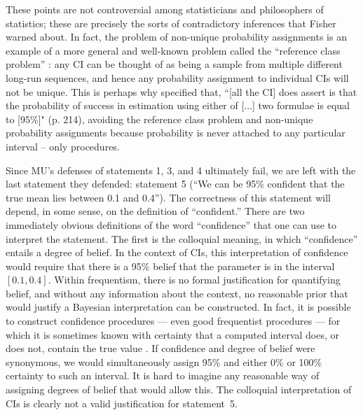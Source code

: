 \documentclass[jou,a4paper,floatsintext,draftfirst]{apa6}\usepackage[]{graphicx}\usepackage[]{color}
\begin{document}
These points are not controversial among statisticians and philosophers of statistics; these are precisely the sorts of contradictory inferences that Fisher warned about. In fact, the problem of non-unique probability assignments is an example of a more general and well-known problem called the ``reference class problem'' \citep{Venn:1888,Reichenbach:1949}: any CI can be thought of as being a sample from multiple different long-run sequences, and hence any probability assignment to individual CIs will not be unique. This is perhaps why \citet{Neyman:1952} specified that, ``[all the CI] does assert is that the probability of success in estimation using either of [...] two formulae is equal to [95\%]" (p. 214), avoiding the reference class problem and non-unique probability assignments because probability is never attached to any particular interval -- only procedures. 

 
Since MU's defenses of statements 1, 3, and 4 ultimately fail, we are left with the last statement they defended: statement 5 (``We can be 95\% confident that the true mean lies between 0.1 and 0.4''). The correctness of this statement will depend, in some sense, on the definition of ``confident.'' There are two immediately obvious definitions of the word ``confidence'' that one can use to interpret the statement. The first is the colloquial meaning, in which ``confidence'' entails a degree of belief.  In the context of CIs, this interpretation of confidence would require that there is a 95\% belief that the parameter is in the interval $[0.1, 0.4]$. Within frequentism, there is no formal justification for quantifying belief, and without any information about the context, no reasonable prior that would justify a Bayesian interpretation can be constructed. In fact, it is possible to construct confidence procedures --- even good frequentist procedures --- for which it is sometimes known with certainty that a computed interval does, or does not, contain the true value \citep{Berger:Wolpert:1988,Morey:etal:unpublished}. If confidence and degree of belief were synonymous, we would simultaneously assign 95\% and either 0\% or 100\% certainty to such an interval. It is hard to imagine any reasonable way of assigning degrees of belief that would allow this. The colloquial interpretation of CIs is clearly not a valid justification for statement~5.
\end{document}
